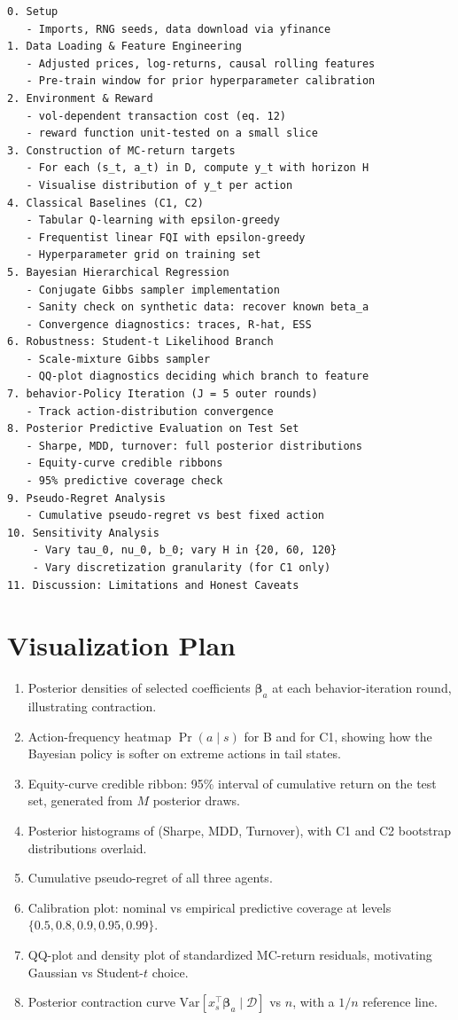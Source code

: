 \documentclass[11pt]{article}
\newcommand{\Var}{\mathrm{Var}}
\newcommand{\D}{\mathcal{D}}
\begin{document}
\begin{lstlisting}
0. Setup
   - Imports, RNG seeds, data download via yfinance
1. Data Loading & Feature Engineering
   - Adjusted prices, log-returns, causal rolling features
   - Pre-train window for prior hyperparameter calibration
2. Environment & Reward
   - vol-dependent transaction cost (eq. 12)
   - reward function unit-tested on a small slice
3. Construction of MC-return targets
   - For each (s_t, a_t) in D, compute y_t with horizon H
   - Visualise distribution of y_t per action
4. Classical Baselines (C1, C2)
   - Tabular Q-learning with epsilon-greedy
   - Frequentist linear FQI with epsilon-greedy
   - Hyperparameter grid on training set
5. Bayesian Hierarchical Regression
   - Conjugate Gibbs sampler implementation
   - Sanity check on synthetic data: recover known beta_a
   - Convergence diagnostics: traces, R-hat, ESS
6. Robustness: Student-t Likelihood Branch
   - Scale-mixture Gibbs sampler
   - QQ-plot diagnostics deciding which branch to feature
7. behavior-Policy Iteration (J = 5 outer rounds)
   - Track action-distribution convergence
8. Posterior Predictive Evaluation on Test Set
   - Sharpe, MDD, turnover: full posterior distributions
   - Equity-curve credible ribbons
   - 95% predictive coverage check
9. Pseudo-Regret Analysis
   - Cumulative pseudo-regret vs best fixed action
10. Sensitivity Analysis
    - Vary tau_0, nu_0, b_0; vary H in {20, 60, 120}
    - Vary discretization granularity (for C1 only)
11. Discussion: Limitations and Honest Caveats
\end{lstlisting}

\section{Visualization Plan}

\begin{enumerate}[leftmargin=*]
\item Posterior densities of selected coefficients $\bm\beta_a$ at each behavior-iteration round, illustrating contraction.
\item Action-frequency heatmap $\Pr(a \mid s)$ for B and for C1, showing how the Bayesian policy is softer on extreme actions in tail states.
\item Equity-curve credible ribbon: 95\% interval of cumulative return on the test set, generated from $M$ posterior draws.
\item Posterior histograms of (Sharpe, MDD, Turnover), with C1 and C2 bootstrap distributions overlaid.
\item Cumulative pseudo-regret of all three agents.
\item Calibration plot: nominal vs empirical predictive coverage at levels $\{0.5, 0.8, 0.9, 0.95, 0.99\}$.
\item QQ-plot and density plot of standardized MC-return residuals, motivating Gaussian vs Student-$t$ choice.
\item Posterior contraction curve $\Var[x_s^\top \bm\beta_a \mid \D]$ vs $n$, with a $1/n$ reference line.
\end{enumerate}
\end{document}
